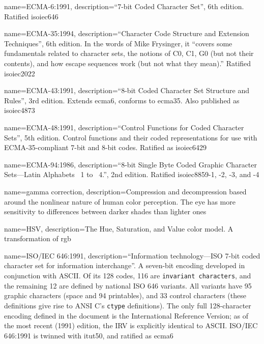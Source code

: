 {
  name={ECMA-6:1991},
  description={``7-bit Coded Character Set'', 6th edition. Ratified
    \Gls{isoiec646}}
}

{
  name={ECMA-35:1994},
  description={``Character Code Structure and Extension Techniques'', 6th
    edition. In the words of Mike Frysinger, it ``covers some fundamentals
    related to character sets, the notions of \Gls{C0}, C1, G0 (but not their
    contents), and how escape sequences work (but not what they mean)\cite{hterm}.''
    Ratified \Gls{isoiec2022}}
}

{
  name={ECMA-43:1991},
    description={``8-bit Coded Character Set Structure and Rules'', 3rd edition. Extends
      \Gls{ecma6}, conforms to \Gls{ecma35}. Also published as \Gls{isoiec4873}}
}

{
  name={ECMA-48:1991},
  description={``Control Functions for Coded Character Sets'', 5th edition.
    Control functions and their coded representations for use with ECMA-35-compliant
    7-bit and 8-bit codes.
   Ratified as \Gls{isoiec6429}}
}

{
  name={ECMA-94:1986},
  description={``8-bit Single Byte Coded Graphic Character Sets---Latin
    Alphabets \textnumero\ 1 to \textnumero\ 4.'', 2nd edition. Ratified
    \Gls{isoiec8859}-1, -2, -3, and -4}
}

{
  name={gamma correction},
  description={Compression and decompression based around the nonlinear nature
   of human color perception. The eye has more sensitivity to differences between
   darker shades than lighter ones}
}

{
  name={HSV},
  description={The Hue, Saturation, and Value color model. A transformation of \Gls{rgb}}
}

{
  name={ISO/IEC 646:1991},
  description={``Information technology---ISO 7-bit coded character set for
    information interchange''. A seven-bit encoding developed in conjunction
    with ASCII. Of its 128 codes, 116 are \texttt{invariant characters}, and
    the remaining 12 are defined by national ISO 646 variants. All variants
    have 95 graphic characters (space and 94 printables), and 33 control
    characters (these definitions give rise to ANSI C's \texttt{ctype}
    definitions). The only full 128-character encoding defined in the document
    is the International Reference Version; as of the most recent (1991)
    edition, the IRV is explicitly identical to ASCII. ISO/IEC 646:1991 is
    twinned with \Gls{itut50}, and ratified as \Gls{ecma6}}
}

